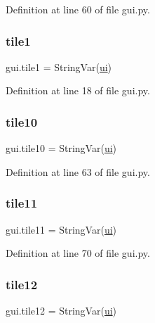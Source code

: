 Definition at line 60 of file gui.\+py.

\mbox{\label{namespacegui_a50ef8346e02b4fb74cc1f3c01cc5327a}} 
\subsubsection{\texorpdfstring{tile1}{tile1}}
{\footnotesize\ttfamily gui.\+tile1 = String\+Var(\mbox{\hyperlink{namespacegui_a40ab7281456eadbea2dc2038f5c24fa1}{ui}})}



Definition at line 18 of file gui.\+py.

\mbox{\label{namespacegui_adea3a4aee4c39cdfa687e806344201e1}} 
\subsubsection{\texorpdfstring{tile10}{tile10}}
{\footnotesize\ttfamily gui.\+tile10 = String\+Var(\mbox{\hyperlink{namespacegui_a40ab7281456eadbea2dc2038f5c24fa1}{ui}})}



Definition at line 63 of file gui.\+py.

\mbox{\label{namespacegui_a3c6b012086064f85132d75c185f03f15}} 
\subsubsection{\texorpdfstring{tile11}{tile11}}
{\footnotesize\ttfamily gui.\+tile11 = String\+Var(\mbox{\hyperlink{namespacegui_a40ab7281456eadbea2dc2038f5c24fa1}{ui}})}



Definition at line 70 of file gui.\+py.

\mbox{\label{namespacegui_ae3a967cdb231db565ecb3d01cc1742c6}} 
\subsubsection{\texorpdfstring{tile12}{tile12}}
{\footnotesize\ttfamily gui.\+tile12 = String\+Var(\mbox{\hyperlink{namespacegui_a40ab7281456eadbea2dc2038f5c24fa1}{ui}})}



